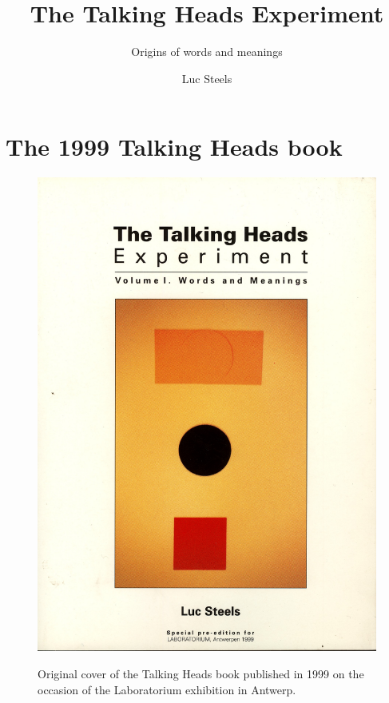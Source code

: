 \documentclass[ number=1
			   ,series=cmle
			   ,url=http://langsci-press.org/catalog/book/49 
			   ,isbn=978-3-944675-42-8
			   ,output=short   %
			   ,smallfont
			   ,biblatex
			  ]{LSP/langsci}
\title{The Talking Heads Experiment}
\subtitle{Origins of words and meanings}
\author{Luc Steels}
\begin{document}
 


\maketitle                
\frontmatter

\tableofcontents    

\mainmatter 

\part{The 1999 Talking Heads book} \label{part:1}

\begin{figure}[htbp]
  \centerline{\includegraphics[width=.95\textwidth]{extra/figs/cover-original-book.pdf}}
  
{ Original cover of the Talking Heads book published in 1999 on the occasion of the 
Laboratorium exhibition in Antwerp.}
\end{figure}
%







%
\end{document}
